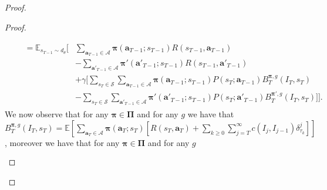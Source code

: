 \documentclass{article}
\begin{document}
\begin{proof}
\begin{proof}
\begin{align}
\begin{aligned}
\end{aligned}
\\&\begin{aligned}=\mathbb{E}_{s_{T-1}\sim d_\theta}\Bigg[&\sum_{\boldsymbol{a}_{T-1}\in\boldsymbol{\mathcal{A}}}\boldsymbol{\pi}(\boldsymbol{a}_{T-1};s_{T-1})R(s_{T-1},\boldsymbol{a}_{T-1})
\\&-\sum_{\boldsymbol{a'}_{T-1}\in\boldsymbol{\mathcal{A}}}\boldsymbol{\pi'}(\boldsymbol{a'}_{T-1};s_{T-1})R(s_{T-1},\boldsymbol{a'}_{T-1})
\\&+\gamma \Bigg[\sum_{s_T\in\mathcal{S}}\sum_{\boldsymbol{a}_{T-1}\in\boldsymbol{\mathcal{A}}}\boldsymbol{\pi}(\boldsymbol{a}_{T-1};s_{T-1})P(s_T;\boldsymbol{a}_{T-1})B^{\boldsymbol{\pi},g}_{T}(I_{T},s_{T})
\\&-
\sum_{s_T\in\mathcal{S}}\sum_{\boldsymbol{a'}_{T-1}\in\boldsymbol{\mathcal{A}}}\boldsymbol{\pi'}(\boldsymbol{a'}_{T-1};s_{T-1})P(s_T;\boldsymbol{a'}_{T-1})B^{\boldsymbol{\pi'},g}_{T}(I_{T},s_{T})\Bigg]\Bigg].
\end{aligned}
\end{align}
We now observe that for any $\boldsymbol{\pi}\in\boldsymbol{\Pi}$ and for any $g$ we have that $B^{\boldsymbol{\pi},g}_{T}(I_{T},s_{T})=\mathbb{E}\left[\sum_{\boldsymbol{a}_{T}\in\boldsymbol{\mathcal{A}}}\boldsymbol{\pi}(\boldsymbol{a}_{T};s_{T})\left[
R(s_{T},\boldsymbol{a}_{T})+\sum_{k\geq 0}\sum_{j= T}^\infty c(I_j,I_{j-1})\delta^j_{\tau_k}\right]\right]$, moreover we have that for any $\boldsymbol{\pi}\in\boldsymbol{\Pi}$ and for any $g$ 
\begin{align*}
&\begin{aligned}

\end{aligned}
\end{align*}
\end{proof}
\end{proof}
\end{document}
